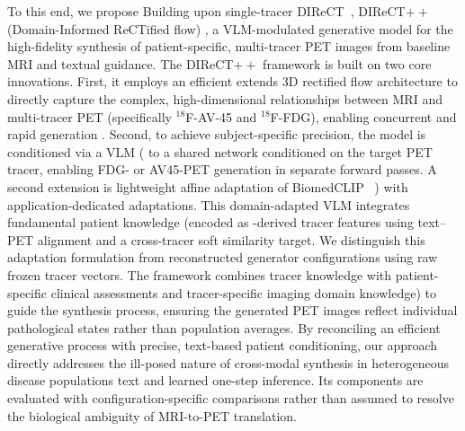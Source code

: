 \documentclass{article}
\providecommand{\DIFaddtex}[1]{{\protect\color{blue} \sf #1}} %
\providecommand{\DIFdeltex}[1]{{\protect\color{red} \scriptsize #1}} %
\providecommand{\DIFaddbegin}{} %
\providecommand{\DIFaddend}{} %
\providecommand{\DIFdelbegin}{} %
\providecommand{\DIFdelend}{} %
\providecommand{\DIFadd}[1]{\texorpdfstring{\DIFaddtex{#1}}{#1}} %
\providecommand{\DIFdel}[1]{\texorpdfstring{\DIFdeltex{#1}}{}} %
\newcommand{\DIFscaledelfig}{0.5}
\newlength{\DIFdelgraphicswidth} %
\newlength{\DIFdelgraphicsheight} %
\newcommand{\DIFaddincludegraphics}[2][]{{\color{blue}\fbox{\DIFOincludegraphics[#1]{#2}}}} %
\newcommand{\DIFdelincludegraphics}[2][]{%
\sbox{\DIFdelgraphicsbox}{\DIFOincludegraphics[#1]{#2}}%
\settoboxwidth{\DIFdelgraphicswidth}{\DIFdelgraphicsbox} %
\settoboxtotalheight{\DIFdelgraphicsheight}{\DIFdelgraphicsbox} %
\scalebox{\DIFscaledelfig}{%
\parbox[b]{\DIFdelgraphicswidth}{\usebox{\DIFdelgraphicsbox}\\[-\baselineskip] \rule{\DIFdelgraphicswidth}{0em}}\llap{\resizebox{\DIFdelgraphicswidth}{\DIFdelgraphicsheight}{%
\setlength{\unitlength}{\DIFdelgraphicswidth}%
\begin{picture}(1,1)%
\thicklines\linethickness{2pt} %
{\color[rgb]{1,0,0}\put(0,0){\framebox(1,1){}}}%
{\color[rgb]{1,0,0}\put(0,0){\line( 1,1){1}}}%
{\color[rgb]{1,0,0}\put(0,1){\line(1,-1){1}}}%
\end{picture}%
}\hspace*{3pt}}} %
} %
\DeclareRobustCommand{\DIFaddbegin}{\DIFOaddbegin \let\includegraphics\DIFaddincludegraphics} %
\DeclareRobustCommand{\DIFaddend}{\DIFOaddend \let\includegraphics\DIFOincludegraphics} %
\DeclareRobustCommand{\DIFdelbegin}{\DIFOdelbegin \let\includegraphics\DIFdelincludegraphics} %
\DeclareRobustCommand{\DIFdelend}{\DIFOaddend \let\includegraphics\DIFOincludegraphics} %
\begin{document}
\DIFdelbegin \DIFdel{To this end, we propose }\DIFdelend \DIFaddbegin \DIFadd{Building upon single-tracer DIReCT~\cite{liu2025direct}, }\DIFaddend DIReCT$++$ (Domain-Informed ReCTified flow) \DIFdelbegin \DIFdel{, a VLM-modulated generative model for the high-fidelity synthesis of patient-specific, multi-tracer PET images from baseline MRI and textual guidance. The DIReCT$++$ framework is built on two core innovations. First, it employs an efficient }\DIFdelend \DIFaddbegin \DIFadd{extends }\DIFaddend 3D rectified flow \DIFdelbegin \DIFdel{architecture to directly capture the complex, high-dimensional relationships between MRI and multi-tracer PET (specifically $^{18}$F-AV-45 and $^{18}$F-FDG), enabling concurrent and rapid generation . Second, to achieve subject-specific precision, the model is conditioned via a VLM (}\DIFdelend \DIFaddbegin \DIFadd{to a shared network conditioned on the target PET tracer, enabling FDG- or AV45-PET generation in separate forward passes. A second extension is lightweight affine adaptation of }\DIFaddend BiomedCLIP~\cite{zhang2025multimodal}\DIFdelbegin \DIFdel{) with application-dedicated adaptations. This domain-adapted VLM integrates fundamental patient knowledge (encoded as }\DIFdelend \DIFaddbegin \DIFadd{-derived tracer features using text--PET alignment and a cross-tracer soft similarity target. We distinguish this adaptation formulation from reconstructed generator configurations using raw frozen tracer vectors. The framework combines tracer knowledge with }\DIFaddend patient-specific clinical \DIFdelbegin \DIFdel{assessments and tracer-specific imaging domain knowledge) to guide the synthesis process, ensuring the generated PET images reflect individual pathological states rather than population averages. By reconciling an efficient generative process with precise, text-based patient conditioning, our approach directly addresses the ill-posed nature of cross-modal synthesis in heterogeneous disease populations}\DIFdelend \DIFaddbegin \DIFadd{text and learned one-step inference. Its components are evaluated with configuration-specific comparisons rather than assumed to resolve the biological ambiguity of MRI-to-PET translation}\DIFaddend .
\end{document}
